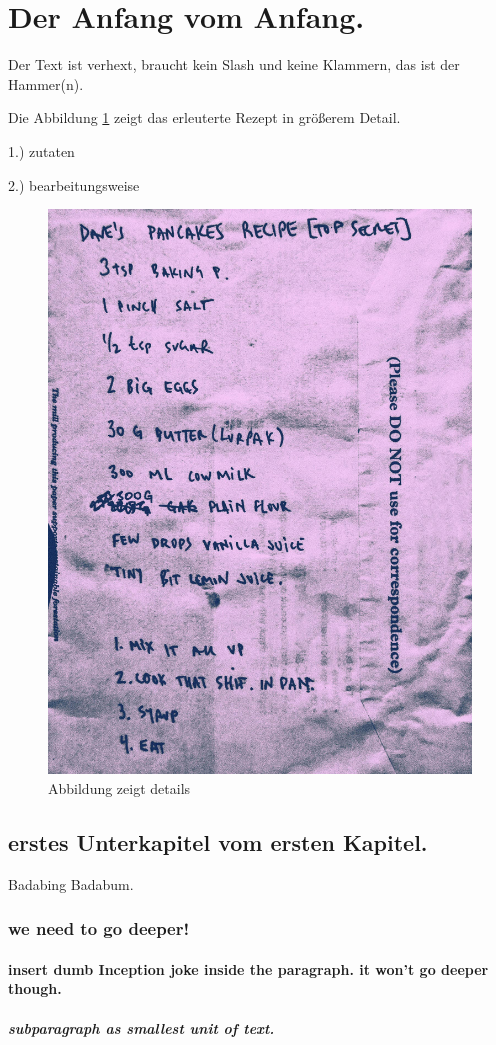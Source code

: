 \section{Der Anfang vom Anfang.}
    Der Text ist verhext, braucht kein Slash und keine Klammern, 
    das ist der Hammer(n).
    
        Die Abbildung \ref{fig:DAVES_PANCAKES_RECIPE} zeigt das erleuterte Rezept
        in größerem Detail. 

        1.) zutaten

        2.) bearbeitungsweise

        \begin{figure}[H]
            \centering
            \includegraphics[width=0.5\linewidth]{graphics/DAVES_PANCAKES_RECIPE.jpg}
            \caption[cooles rezept]{Abbildung zeigt details}
    
            
            \label{fig:DAVES_PANCAKES_RECIPE}
        \end{figure}
        
        \subsection {erstes Unterkapitel vom ersten Kapitel.}
        Badabing Badabum.

            \subsubsection{we need to go deeper!}

                \paragraph{insert dumb Inception joke inside the paragraph. it won't go deeper though.} 
                   
                    \subparagraph{subparagraph as smallest unit of text.}

        \listoffigures
